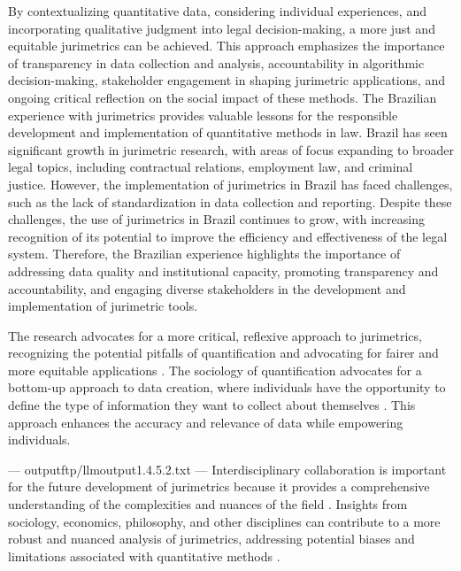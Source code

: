 By contextualizing quantitative data, considering individual experiences, and incorporating qualitative judgment into legal decision-making, a more just and equitable jurimetrics can be achieved. This approach emphasizes the importance of transparency in data collection and analysis, accountability in algorithmic decision-making, stakeholder engagement in shaping jurimetric applications, and ongoing critical reflection on the social impact of these methods. The Brazilian experience with jurimetrics provides valuable lessons for the responsible development and implementation of quantitative methods in law. Brazil has seen significant growth in jurimetric research, with areas of focus expanding to broader legal topics, including contractual relations, employment law, and criminal justice. However, the implementation of jurimetrics in Brazil has faced challenges, such as the lack of standardization in data collection and reporting. Despite these challenges, the use of jurimetrics in Brazil continues to grow, with increasing recognition of its potential to improve the efficiency and effectiveness of the legal system. Therefore, the Brazilian experience highlights the importance of addressing data quality and institutional capacity, promoting transparency and accountability, and engaging diverse stakeholders in the development and implementation of jurimetric tools.

The research advocates for a more critical, reflexive approach to jurimetrics, recognizing the potential pitfalls of quantification and advocating for fairer and more equitable applications \cite{10.1590/dados.2022.65.3.267}. The sociology of quantification advocates for a bottom-up approach to data creation, where individuals have the opportunity to define the type of information they want to collect about themselves \cite{10.1590/dados.2022.65.3.267}. This approach enhances the accuracy and relevance of data while empowering individuals.


---
outputftp/llmoutput1.4.5.2.txt
---
Interdisciplinary collaboration is important for the future development of jurimetrics because it provides a comprehensive understanding of the complexities and nuances of the field \cite{10.1007/s11186-021-09453-1,10.5040/9781350220645}. Insights from sociology, economics, philosophy, and other disciplines can contribute to a more robust and nuanced analysis of jurimetrics, addressing potential biases and limitations associated with quantitative methods \cite{10.1007/s11186-021-09453-1,10.5040/9781350220645}.


